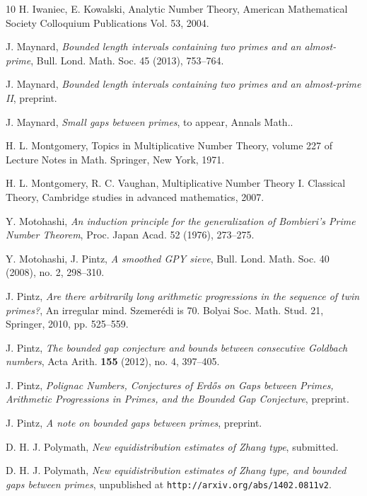 \begin{thebibliography}{10}
  H. Iwaniec, E. Kowalski, Analytic Number Theory,
   American Mathematical Society Colloquium Publications Vol. 53,
   2004.

J. Maynard, \emph{Bounded length intervals containing two primes and an almost-prime}, Bull. Lond. Math. Soc. 45 (2013), 753--764.
  
 J. Maynard, \emph{Bounded length intervals
    containing two primes and an almost-prime II}, preprint.

J. Maynard, \emph{Small gaps between primes}, to appear, Annals Math..
 
H. L. Montgomery, Topics in Multiplicative Number Theory, volume 227
of Lecture Notes in Math. Springer, New York, 1971.


 H. L. Montgomery, R. C. Vaughan, Multiplicative
  Number Theory I. Classical Theory, Cambridge studies in advanced
  mathematics, 2007.

 Y. Motohashi, \emph{An induction principle for the
    generalization of Bombieri's Prime Number Theorem}, Proc. Japan
  Acad. 52 (1976), 273--275.

 Y. Motohashi, J. Pintz, \emph{A smoothed GPY sieve},
  Bull. Lond. Math. Soc. 40 (2008), no. 2, 298--310.

J. Pintz, \emph{Are there arbitrarily long arithmetic progressions in the sequence of twin primes?}, An irregular mind. Szemer\'edi is 70. Bolyai Soc. Math. Stud. 21, Springer, 2010, pp. 525–559.

J. Pintz, \emph{The bounded gap conjecture and bounds between consecutive Goldbach numbers}, Acta Arith. \textbf{155} (2012), no. 4, 397--405. 

 J. Pintz, \emph{Polignac Numbers, Conjectures
    of Erd\H{o}s on Gaps between Primes, Arithmetic Progressions in
    Primes, and the Bounded Gap Conjecture}, preprint.

 J. Pintz, \emph{A note on bounded gaps between
    primes}, preprint.

D. H. J. Polymath, \emph{New equidistribution estimates of Zhang type}, submitted.

D. H. J. Polymath, \emph{New equidistribution estimates of Zhang type, and bounded gaps between primes}, unpublished at {\tt http://arxiv.org/abs/1402.0811v2}.


\end{thebibliography}
